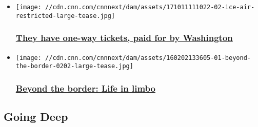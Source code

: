 \begin{itemize}
\item
  \href{/2017/10/13/us/ice-air-deportation-flight/index.html}{}

  \texttt{[image: //cdn.cnn.com/cnnnext/dam/assets/171011111022-02-ice-air-restricted-large-tease.jpg]}

  \hypertarget{they-have-one-way-tickets-paid-for-by-washington}{%
  \subsubsection{\texorpdfstring{\href{/2017/10/13/us/ice-air-deportation-flight/index.html}{They
  have one-way tickets, paid for by
  Washington}}{They have one-way tickets, paid for by Washington}}\label{they-have-one-way-tickets-paid-for-by-washington}}
\item
  \href{/2016/02/04/us/beyond-the-border-life-in-limbo/index.html}{}

  \texttt{[image: //cdn.cnn.com/cnnnext/dam/assets/160202133605-01-beyond-the-border-0202-large-tease.jpg]}

  \hypertarget{beyond-the-border-life-in-limbo}{%
  \subsubsection{\texorpdfstring{\href{/2016/02/04/us/beyond-the-border-life-in-limbo/index.html}{Beyond
  the border: Life in
  limbo}}{Beyond the border: Life in limbo}}\label{beyond-the-border-life-in-limbo}}
\end{itemize}

\hypertarget{going-deep-}{%
\subsection{Going Deep~}\label{going-deep-}}

